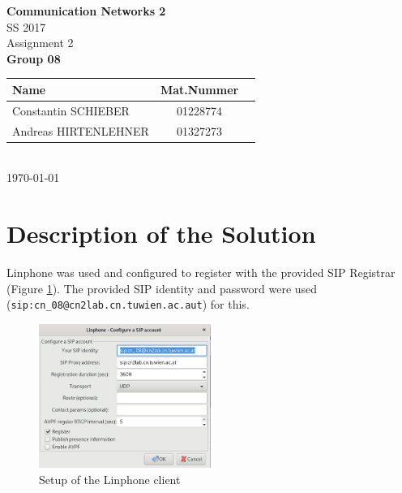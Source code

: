 \documentclass[parskip=full]{scrartcl}
\begin{document}
\begin{titlepage}
    \centering
    \vspace*{2cm}
    {\Huge \textbf{Communication Networks 2}}\\
    SS 2017\\
    \vspace*{1cm}
    {\Large Assignment 2}
    \\\vspace*{3cm}
    {\Large \textbf{Group 08}}\\
    \vspace*{1cm}
    {\large 
        \begin{tabular}{l c c}
            Name & Mat.Nummer \\ \hline
            Constantin SCHIEBER & 01228774 \\
            Andreas HIRTENLEHNER & 01327273
        \end{tabular}
    }
    \\\vspace*{7cm}
    \today
\end{titlepage}

\section{Description of the Solution}
Linphone was used and configured to register with the provided SIP Registrar (Figure \ref{fig:registerLinphone}).
The provided SIP identity and password were used (\texttt{sip:cn\_08@cn2lab.cn.tuwien.ac.aut}) for this.
\begin{figure}[ht]
    \centering
   \includegraphics[width=0.5\textwidth]{images/linphoneSettings.png} 
    \caption{Setup of the Linphone client}
    \label{fig:registerLinphone}
\end{figure}
\end{document}
